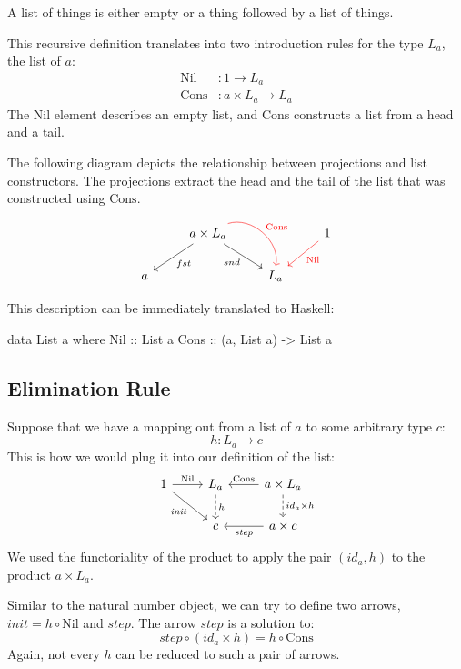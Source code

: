 \documentclass[DaoFP]{subfiles}
\begin{document}
A list of things is either empty or a thing followed by a list of things. 

This recursive definition translates into two introduction rules for the type $L_a$, the list of $a$: 
\begin{align*}
 \text{Nil} &\colon 1 \to L_a \\
 \text{Cons} &\colon a \times L_a \to L_a 
\end{align*}
The $\text{Nil}$ element describes an empty list, and $\text{Cons}$ constructs a list from a head and a tail. 

The following diagram depicts the relationship between projections and list constructors. The projections extract the head and the tail of the list that was constructed using $\text{Cons}$.
\[
 \begin{tikzcd}
 & a \times L_a
 \arrow[ld, "fst"]
 \arrow[rd,  "snd"']
 \arrow[rd, bend left=60, red, "\text{Cons}"]
 && 1
 \arrow[ld, red, "\text{Nil}"]
 \\
 a
&&L_a
  \end{tikzcd}
\]

This description can be immediately translated to Haskell:
\begin{haskell}
data List a where
  Nil  :: List a
  Cons :: (a, List a) -> List a
\end{haskell}



\subsection{Elimination Rule}

Suppose that we have a mapping out from a list of $a$ to some arbitrary type $c$:
\[h \colon L_a \to c\]
This is how we would plug it into our definition of the list:
\[
 \begin{tikzcd}
 1
 \arrow[r, "\text{Nil}"]
 \arrow[rd, "\mathit{init}"']
 &L_a
\arrow[d, dashed, "h"]
&a \times L_a
  \arrow[l, "\text{Cons}"']
\arrow[d, dashed, "id_a \times h"]
\\
& c
& a \times c
\arrow[l, "\mathit{step}"]
  \end{tikzcd}
\]
We used the functoriality of the product to apply the pair $(id_a, h)$ to the product $a \times L_a$.

Similar to the natural number object, we can try to define two arrows, $\mathit{init} = h \circ \text{Nil}$ and $\mathit{step}$. The arrow $\mathit{step}$ is a solution to:
\[ \mathit{step} \circ (id_a \times h) = h \circ \text{Cons} \]
Again, not every $h$ can be reduced to such a pair of arrows.
\end{document}
